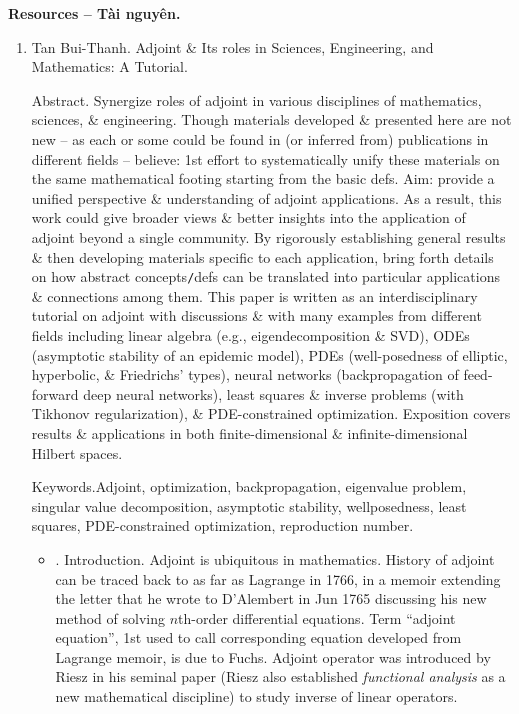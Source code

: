 \documentclass{article}
\begin{document}
\noindent\textbf{\textsf{Resources -- Tài nguyên.}}
\begin{enumerate}
	\item {\sc Tan Bui-Thanh}. {\sc Adjoint \& Its roles in Sciences, Engineering, and Mathematics: A Tutorial}.
	
	{\sf Abstract.} Synergize roles of adjoint in various disciplines of mathematics, sciences, \& engineering. Though materials developed \& presented here are not new -- as each or some could be found in (or inferred from) publications in different fields -- believe: 1st effort to systematically unify these materials on the same mathematical footing starting from the basic defs. Aim: provide a unified perspective \& understanding of adjoint applications. As a result, this work could give broader views \& better insights into the application of adjoint beyond a single community. By rigorously establishing general results \& then developing materials specific to each application, bring forth details on how abstract concepts{\tt/}defs can be translated into particular applications \& connections among them. This paper is written as an interdisciplinary tutorial on adjoint with discussions \& with many examples from different fields including linear algebra (e.g., eigendecomposition \& SVD), ODEs (asymptotic stability of an epidemic model), PDEs (well-posedness of elliptic, hyperbolic, \& Friedrichs' types), neural networks (backpropagation of feed-forward deep neural networks), least squares \& inverse problems (with Tikhonov regularization), \& PDE-constrained optimization. Exposition covers results \& applications in both finite-dimensional \& infinite-dimensional Hilbert spaces.
	
	{\sf Keywords.}Adjoint, optimization, backpropagation, eigenvalue problem, singular value decomposition, asymptotic stability, wellposedness, least squares, PDE-constrained optimization, reproduction number.
	\begin{itemize}
		\item {. Introduction.} Adjoint is ubiquitous in mathematics. History of adjoint can be traced back to as far as {\sc Lagrange} in 1766, in a memoir extending the letter that he wrote to {\sc D'Alembert} in Jun 1765 discussing his new method of solving $n$th-order differential equations. Term ``adjoint equation'', 1st used to call corresponding equation developed from Lagrange memoir, is due to {\sc Fuchs}. Adjoint operator was introduced by {\sc Riesz} in his seminal paper ({\sc Riesz} also established {\it functional analysis} as a new mathematical discipline) to study inverse of linear operators.
		

\end{itemize}
\end{enumerate}
\end{document}
